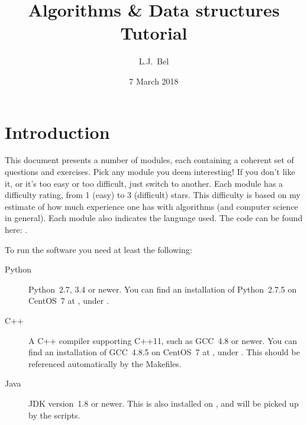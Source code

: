 \documentclass[12pt]{article}
\title{{Algorithms \& Data structures}\\{\large Tutorial}}
\author{L.J.~Bel}
\date{7 March 2018}
\begin{document}
\maketitle

\section*{Introduction}

This document presents a number of modules, each containing a coherent set of questions and exercises. Pick any module you deem interesting! If you don't like it, or it's too easy or too difficult, just switch to another. Each module has a difficulty rating, from 1 (easy) to 3 (difficult) stars. This difficulty is based on my estimate of how much experience one has with algorithms (and computer science in general). Each module also indicates the language used. The code can be found here: \mbox{\href{https://github.com/lbel/icsc2018}{}}.

To run the software you need at least the following:
\begin{description}
    \item[Python] Python~2.7, 3.4 or newer. You can find an installation of Python~2.7.5 on CentOS~7 at , under .
    \item[C++] A C++ compiler supporting C++11, such as GCC~4.8 or newer. You can find an installation of GCC~4.8.5 on CentOS~7 at , under . This should be referenced automatically by the Makefiles.
    \item[Java] JDK version~1.8 or newer. This is also installed on , and will be picked up by the scripts.
\end{description}

\clearpage
\tableofcontents

\clearpage


\clearpage


\clearpage


\clearpage


\clearpage


\clearpage

\end{document}
